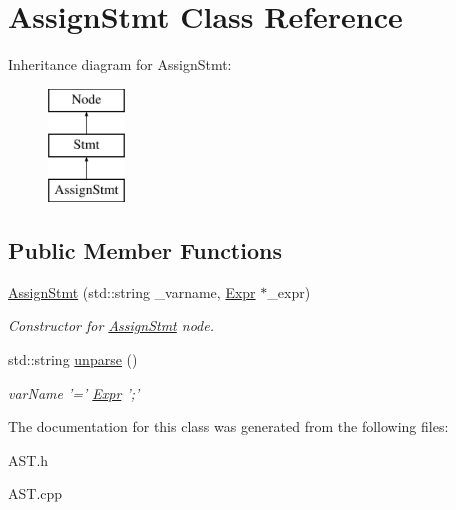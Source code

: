 \hypertarget{classAssignStmt}{\section{Assign\-Stmt Class Reference}
\label{classAssignStmt}
}
Inheritance diagram for Assign\-Stmt\-:\begin{figure}[H]
\begin{center}
\leavevmode
\includegraphics[height=3.000000cm]{classAssignStmt}
\end{center}
\end{figure}
\subsection*{Public Member Functions}
\begin{DoxyCompactItemize}
\item 
\hypertarget{classAssignStmt_a97d349414b5b4f701d3b100b809ab87b}{\hyperlink{classAssignStmt_a97d349414b5b4f701d3b100b809ab87b}{Assign\-Stmt} (std\-::string \-\_\-varname, \hyperlink{classExpr}{Expr} $\ast$\-\_\-expr)}\label{classAssignStmt_a97d349414b5b4f701d3b100b809ab87b}

\begin{DoxyCompactList}\small\item\em Constructor for \hyperlink{classAssignStmt}{Assign\-Stmt} node. \end{DoxyCompactList}\item 
\hypertarget{classAssignStmt_a75c486b76cc79311bfb5348175b769e2}{std\-::string \hyperlink{classAssignStmt_a75c486b76cc79311bfb5348175b769e2}{unparse} ()}\label{classAssignStmt_a75c486b76cc79311bfb5348175b769e2}

\begin{DoxyCompactList}\small\item\em var\-Name '=' \hyperlink{classExpr}{Expr} ';' \end{DoxyCompactList}\end{DoxyCompactItemize}


The documentation for this class was generated from the following files\-:\begin{DoxyCompactItemize}
\item 
A\-S\-T.\-h\item 
A\-S\-T.\-cpp\end{DoxyCompactItemize}
